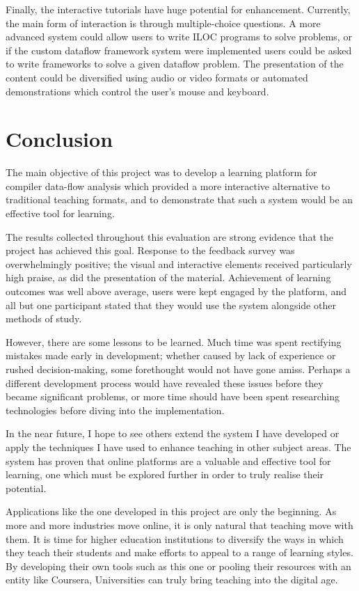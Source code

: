 \documentclass[bsc,twoside,singlespacing,parskip,logo,notimes,normalheadings]{infthesis}
\begin{document}
    Finally, the interactive tutorials have huge potential for
    enhancement. Currently, the main form of interaction is through
    multiple-choice questions. A more advanced system could allow
    users to write ILOC programs to solve problems, or if the custom
    \gls{dataflow} framework system were implemented users could be
    asked to write frameworks to solve a given \gls{dataflow}
    problem. The presentation of the content could be diversified
    using audio or video formats or automated demonstrations which
    control the user's mouse and keyboard.

    \section{Conclusion}
    The main objective of this project was to develop a learning
    platform for compiler data-flow analysis which provided a more
    interactive alternative to traditional teaching formats, and to
    demonstrate that such a system would be an effective tool for
    learning.

    The results collected throughout this evaluation are strong
    evidence that the project has achieved this goal. Response to the
    feedback survey was overwhelmingly positive; the visual and
    interactive elements received particularly high praise, as did the
    presentation of the material. Achievement of learning outcomes was
    well above average, users were kept engaged by the platform, and
    all but one participant stated that they would use the system
    alongside other methods of study.

    However, there are some lessons to be learned. Much time was spent
    rectifying mistakes made early in development; whether caused by
    lack of experience or rushed decision-making, some forethought
    would not have gone amiss. Perhaps a different development process
    would have revealed these issues before they became significant
    problems, or more time should have been spent researching
    technologies before diving into the implementation.

    In the near future, I hope to see others extend the system I have
    developed or apply the techniques I have used to enhance teaching
    in other subject areas. The system has proven that online
    platforms are a valuable and effective tool for learning, one
    which must be explored further in order to truly realise their
    potential.

    Applications like the one developed in this project are only the
    beginning. As more and more industries move online, it is only
    natural that teaching move with them. It is time for higher
    education institutions to diversify the ways in which they teach
    their students and make efforts to appeal to a range of learning
    styles. By developing their own tools such as this one or pooling
    their resources with an entity like Coursera, Universities can
    truly bring teaching into the digital age.
    
\end{document}
